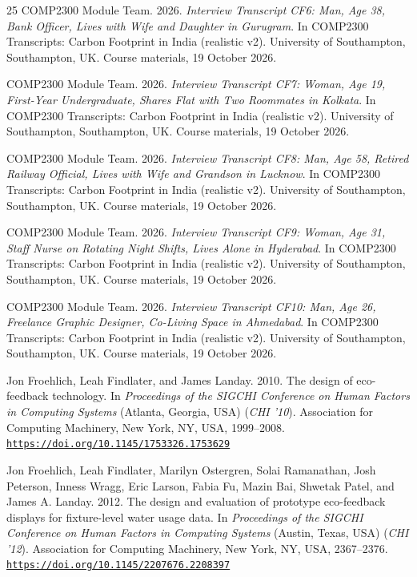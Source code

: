 \documentclass[12pt, a4paper]{article}
\newcommand{\doi}[1]{\href{https://doi.org/#1}{\nolinkurl{https://doi.org/#1}}}
\begin{document}
\begin{thebibliography}{25}
COMP2300 Module Team. 2026. \textit{Interview Transcript CF6: Man, Age 38, Bank Officer, Lives with Wife and Daughter in Gurugram}. In COMP2300 Transcripts: Carbon Footprint in India (realistic v2). University of Southampton, Southampton, UK. Course materials, 19 October 2026.

COMP2300 Module Team. 2026. \textit{Interview Transcript CF7: Woman, Age 19, First-Year Undergraduate, Shares Flat with Two Roommates in Kolkata}. In COMP2300 Transcripts: Carbon Footprint in India (realistic v2). University of Southampton, Southampton, UK. Course materials, 19 October 2026.

COMP2300 Module Team. 2026. \textit{Interview Transcript CF8: Man, Age 58, Retired Railway Official, Lives with Wife and Grandson in Lucknow}. In COMP2300 Transcripts: Carbon Footprint in India (realistic v2). University of Southampton, Southampton, UK. Course materials, 19 October 2026.

COMP2300 Module Team. 2026. \textit{Interview Transcript CF9: Woman, Age 31, Staff Nurse on Rotating Night Shifts, Lives Alone in Hyderabad}. In COMP2300 Transcripts: Carbon Footprint in India (realistic v2). University of Southampton, Southampton, UK. Course materials, 19 October 2026.

COMP2300 Module Team. 2026. \textit{Interview Transcript CF10: Man, Age 26, Freelance Graphic Designer, Co-Living Space in Ahmedabad}. In COMP2300 Transcripts: Carbon Footprint in India (realistic v2). University of Southampton, Southampton, UK. Course materials, 19 October 2026.

Jon Froehlich, Leah Findlater, and James Landay. 2010. The design of eco-feedback technology. In \textit{Proceedings of the SIGCHI Conference on Human Factors in Computing Systems} (Atlanta, Georgia, USA) (\textit{CHI '10}). Association for Computing Machinery, New York, NY, USA, 1999--2008. \doi{10.1145/1753326.1753629}

Jon Froehlich, Leah Findlater, Marilyn Ostergren, Solai Ramanathan, Josh Peterson, Inness Wragg, Eric Larson, Fabia Fu, Mazin Bai, Shwetak Patel, and James A. Landay. 2012. The design and evaluation of prototype eco-feedback displays for fixture-level water usage data. In \textit{Proceedings of the SIGCHI Conference on Human Factors in Computing Systems} (Austin, Texas, USA) (\textit{CHI '12}). Association for Computing Machinery, New York, NY, USA, 2367--2376. \doi{10.1145/2207676.2208397}


\end{thebibliography}
\end{document}

